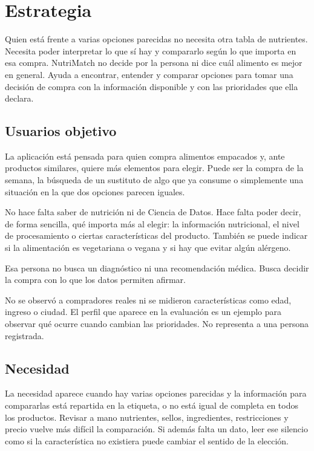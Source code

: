 \section{Estrategia}

Quien está frente a varias opciones parecidas no necesita otra tabla de nutrientes. Necesita poder interpretar lo que sí hay y compararlo según lo que importa en esa compra. NutriMatch no decide por la persona ni dice cuál alimento es mejor en general. Ayuda a encontrar, entender y comparar opciones para tomar una decisión de compra con la información disponible y con las prioridades que ella declara.

\subsection{Usuarios objetivo}

La aplicación está pensada para quien compra alimentos empacados y, ante productos similares, quiere más elementos para elegir. Puede ser la compra de la semana, la búsqueda de un sustituto de algo que ya consume o simplemente una situación en la que dos opciones parecen iguales.

No hace falta saber de nutrición ni de Ciencia de Datos. Hace falta poder decir, de forma sencilla, qué importa más al elegir: la información nutricional, el nivel de procesamiento o ciertas características del producto. También se puede indicar si la alimentación es vegetariana o vegana y si hay que evitar algún alérgeno.

Esa persona no busca un diagnóstico ni una recomendación médica. Busca decidir la compra con lo que los datos permiten afirmar.

No se observó a compradores reales ni se midieron características como edad, ingreso o ciudad. El perfil que aparece en la evaluación es un ejemplo para observar qué ocurre cuando cambian las prioridades. No representa a una persona registrada.

\subsection{Necesidad}

La necesidad aparece cuando hay varias opciones parecidas y la información para compararlas está repartida en la etiqueta, o no está igual de completa en todos los productos. Revisar a mano nutrientes, sellos, ingredientes, restricciones y precio vuelve más difícil la comparación. Si además falta un dato, leer ese silencio como si la característica no existiera puede cambiar el sentido de la elección.

